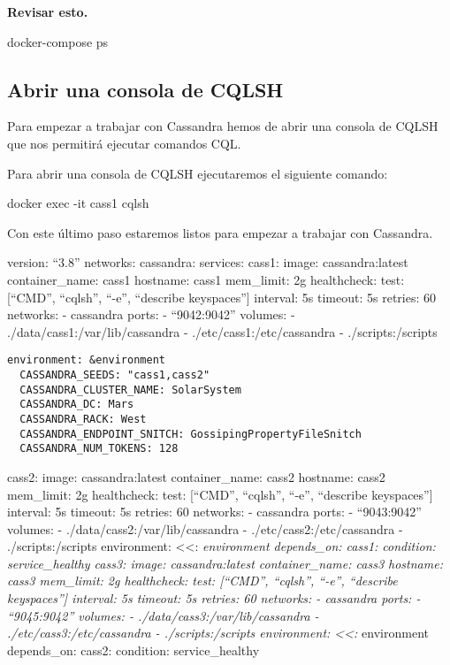 \documentclass[
]{book}
\newenvironment{Shaded}{}{}
\newcommand{\AttributeTok}[1]{\textcolor[rgb]{0.49,0.56,0.16}{#1}}
\newcommand{\ExtensionTok}[1]{#1}
\newcommand{\NormalTok}[1]{#1}
\begin{document}
\textbf{Revisar esto.}

\begin{Shaded}
\begin{Highlighting}[]
\ExtensionTok{docker{-}compose}\NormalTok{ ps}
\end{Highlighting}
\end{Shaded}

\subsection{Abrir una consola de CQLSH}\label{abrir-una-consola-de-cqlsh}

Para empezar a trabajar con Cassandra hemos de abrir una consola de CQLSH que nos permitirá ejecutar comandos CQL.

Para abrir una consola de CQLSH ejecutaremos el siguiente comando:

\begin{Shaded}
\begin{Highlighting}[]
\ExtensionTok{docker}\NormalTok{ exec }\AttributeTok{{-}it}\NormalTok{ cass1 cqlsh}
\end{Highlighting}
\end{Shaded}

Con este último paso estaremos listos para empezar a trabajar con Cassandra.

version: ``3.8'' networks: cassandra: services: cass1: image: cassandra:latest container\_name: cass1 hostname: cass1 mem\_limit: 2g healthcheck: test: {[}``CMD'', ``cqlsh'', ``-e'', ``describe keyspaces''{]} interval: 5s timeout: 5s retries: 60 networks: - cassandra ports: - ``9042:9042'' volumes: - ./data/cass1:/var/lib/cassandra - ./etc/cass1:/etc/cassandra - ./scripts:/scripts

\begin{verbatim}
environment: &environment
  CASSANDRA_SEEDS: "cass1,cass2"
  CASSANDRA_CLUSTER_NAME: SolarSystem
  CASSANDRA_DC: Mars
  CASSANDRA_RACK: West
  CASSANDRA_ENDPOINT_SNITCH: GossipingPropertyFileSnitch
  CASSANDRA_NUM_TOKENS: 128
\end{verbatim}

cass2: image: cassandra:latest container\_name: cass2 hostname: cass2 mem\_limit: 2g healthcheck: test: {[}``CMD'', ``cqlsh'', ``-e'', ``describe keyspaces''{]} interval: 5s timeout: 5s retries: 60 networks: - cassandra ports: - ``9043:9042'' volumes: - ./data/cass2:/var/lib/cassandra - ./etc/cass2:/etc/cassandra - ./scripts:/scripts environment: \textless\textless: \emph{environment depends\_on: cass1: condition: service\_healthy cass3: image: cassandra:latest container\_name: cass3 hostname: cass3 mem\_limit: 2g healthcheck: test: {[}``CMD'', ``cqlsh'', ``-e'', ``describe keyspaces''{]} interval: 5s timeout: 5s retries: 60 networks: - cassandra ports: - ``9045:9042'' volumes: - ./data/cass3:/var/lib/cassandra - ./etc/cass3:/etc/cassandra - ./scripts:/scripts environment: \textless\textless: }environment depends\_on: cass2: condition: service\_healthy
\end{document}
